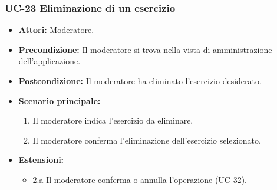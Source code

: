 	\subsubsection{UC-23 Eliminazione di un esercizio}
			\begin{itemize}
			\item \textbf{Attori:} Moderatore.
			\item \textbf{Precondizione:} Il moderatore si trova nella vista di amministrazione dell'applicazione.
			\item \textbf{Postcondizione:} Il moderatore ha eliminato l'esercizio desiderato.
			\item \textbf{Scenario principale:}
				\begin{enumerate}
					\item Il moderatore indica l'esercizio da eliminare.
					\item Il moderatore conferma l'eliminazione dell'esercizio selezionato.
				\end{enumerate}
			\item \textbf{Estensioni:}
			\begin{itemize}
			\item 2.a Il moderatore conferma o annulla l'operazione (UC-32).
			\end{itemize}
		\end{itemize}
